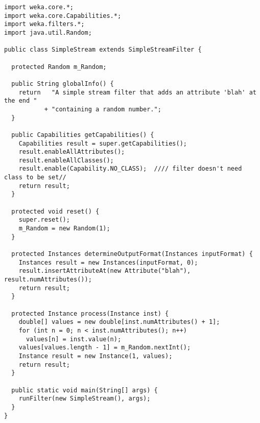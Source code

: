
\begin{verbatim}
import weka.core.*;
import weka.core.Capabilities.*;
import weka.filters.*;
import java.util.Random;

public class SimpleStream extends SimpleStreamFilter {

  protected Random m_Random;

  public String globalInfo() {
    return   "A simple stream filter that adds an attribute 'blah' at the end "
           + "containing a random number.";
  }

  public Capabilities getCapabilities() {
    Capabilities result = super.getCapabilities();
    result.enableAllAttributes();
    result.enableAllClasses();
    result.enable(Capability.NO_CLASS);  //// filter doesn't need class to be set//
    return result;
  }

  protected void reset() {
    super.reset();
    m_Random = new Random(1);
  }

  protected Instances determineOutputFormat(Instances inputFormat) {
    Instances result = new Instances(inputFormat, 0);
    result.insertAttributeAt(new Attribute("blah"), result.numAttributes());
    return result;
  }

  protected Instance process(Instance inst) {
    double[] values = new double[inst.numAttributes() + 1];
    for (int n = 0; n < inst.numAttributes(); n++)
      values[n] = inst.value(n);
    values[values.length - 1] = m_Random.nextInt();
    Instance result = new Instance(1, values);
    return result;
  }

  public static void main(String[] args) {
    runFilter(new SimpleStream(), args);
  }
}
\end{verbatim}
